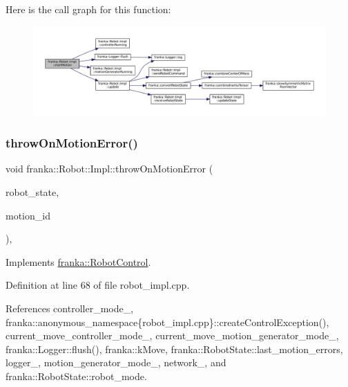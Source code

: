 Here is the call graph for this function\+:
\nopagebreak
\begin{figure}[H]
\begin{center}
\leavevmode
\includegraphics[width=350pt]{classfranka_1_1Robot_1_1Impl_a2f4073ded9e7ecc118a93d233c0f6ed7_cgraph}
\end{center}
\end{figure}
\mbox{\label{classfranka_1_1Robot_1_1Impl_ace3373a95db9754ab9df732d9b1dd1f6}} 
\subsubsection{\texorpdfstring{throw\+On\+Motion\+Error()}{throwOnMotionError()}}
{\footnotesize\ttfamily void franka\+::\+Robot\+::\+Impl\+::throw\+On\+Motion\+Error (\begin{DoxyParamCaption}\item[{const \hyperlink{structfranka_1_1RobotState}{Robot\+State} \&}]{robot\+\_\+state,  }\item[{uint32\+\_\+t}]{motion\+\_\+id }\end{DoxyParamCaption})\hspace{0.3cm}{\ttfamily [override]}, {\ttfamily [virtual]}}



Implements \hyperlink{classfranka_1_1RobotControl_a796e9fb049ffc36ea44bec85f24e2fe4}{franka\+::\+Robot\+Control}.



Definition at line 68 of file robot\+\_\+impl.\+cpp.



References controller\+\_\+mode\+\_\+, franka\+::anonymous\+\_\+namespace\{robot\+\_\+impl.\+cpp\}\+::create\+Control\+Exception(), current\+\_\+move\+\_\+controller\+\_\+mode\+\_\+, current\+\_\+move\+\_\+motion\+\_\+generator\+\_\+mode\+\_\+, franka\+::\+Logger\+::flush(), franka\+::k\+Move, franka\+::\+Robot\+State\+::last\+\_\+motion\+\_\+errors, logger\+\_\+, motion\+\_\+generator\+\_\+mode\+\_\+, network\+\_\+, and franka\+::\+Robot\+State\+::robot\+\_\+mode.


